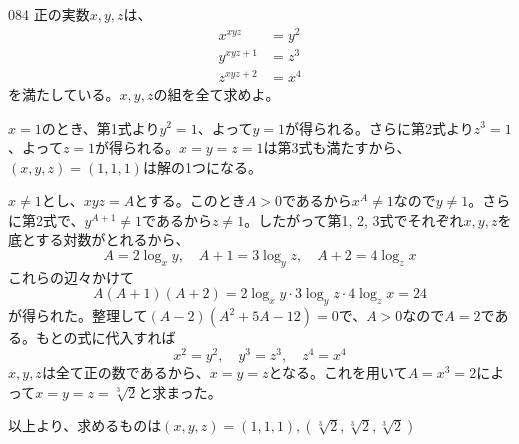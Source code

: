 \begin{prob}{084}{\maru}{}
 正の実数$x, y, z$は、
 \begin{align*}
  x^{xyz}&=y^2 \\
  y^{xyz+1}&=z^3 \\
  z^{xyz+2}&=x^4
 \end{align*}
 を満たしている。$x, y, z$の組を全て求めよ。
\end{prob}

$x=1$のとき、第1式より$y^2=1$、よって$y=1$が得られる。さらに第2式より$z^3=1$、よって$z=1$が得られる。$x=y=z=1$は第3式も満たすから、$(x, y, z)=(1, 1, 1)$は解の1つになる。

$x\neq 1$とし、$xyz=A$とする。このとき$A>0$であるから$x^A\neq 1$なので$y\neq 1$。さらに第2式で、$y^{A+1}\neq 1$であるから$z\neq 1$。したがって第1, 2, 3式でそれぞれ$x, y, z$を底とする対数がとれるから、
\[ A=2\log_x{y},\quad A+1=3\log_y{z},\quad A+2=4\log_z{x} \]
これらの辺々かけて
\[ A(A+1)(A+2)=2\log_x{y}\cdot 3\log_y{z}\cdot 4\log_z{x} = 24 \]
が得られた。整理して$(A-2)(A^2+5A-12)=0$で、$A>0$なので$A=2$である。もとの式に代入すれば
\[ x^2=y^2,\quad y^3=z^3,\quad z^4=x^4 \]
$x, y, z$は全て正の数であるから、$x=y=z$となる。これを用いて$A=x^3=2$によって$x=y=z=\sqrt[3]{2}$と求まった。

以上より、求めるものは$(x, y, z)=(1, 1, 1), (\sqrt[3]{2}, \sqrt[3]{2}, \sqrt[3]{2})$